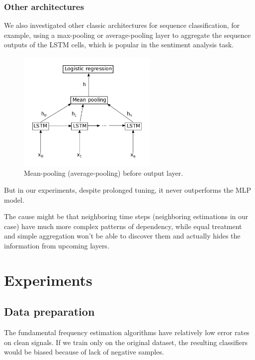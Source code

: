 \documentclass[11pt,a4paper]{report}
\begin{document}
\newpage

\subsection{Other architectures}

We also investigated other classic architectures for sequence classification, for example, using a max-pooling or average-pooling layer to aggregate the sequence outputs of the LSTM cells, which is popular in the sentiment analysis task.

\begin{figure}[htbp]
  \centering
  \includegraphics[width=0.6\textwidth]{sentiment.png}
  \caption{Mean-pooling (average-pooling) before output layer.} \label{fig:sentiment}
\end{figure}

But in our experiments, despite prolonged tuning, it never outperforms the MLP model.

The cause might be that neighboring time steps (neighboring estimations in our case) have much more complex patterns of dependency, while equal treatment and simple aggregation won't be able to discover them and actually hides the information from upcoming layers.

\chapter{Experiments}

\section{Data preparation}

The fundamental frequency estimation algorithms have relatively low error rates on clean signals.
If we train only on the original dataset, the resulting classifiers would be biased because of lack of negative samples.
\end{document}
